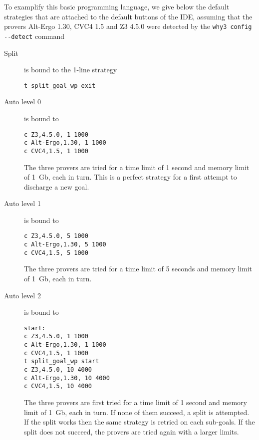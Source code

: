 To examplify this basic programming language, we give below the
default strategies that are attached to the default buttons of the
IDE, assuming that the provers Alt-Ergo 1.30, CVC4 1.5 and Z3 4.5.0
were detected by the \verb|why3 config --detect| command
\begin{description}
\item[Split] is bound to the 1-line strategy
\begin{verbatim}
t split_goal_wp exit
\end{verbatim}

\item[Auto level 0] is bound to
\begin{verbatim}
c Z3,4.5.0, 1 1000
c Alt-Ergo,1.30, 1 1000
c CVC4,1.5, 1 1000
\end{verbatim}
  The three provers are tried for a time limit of 1 second and memory
  limit of 1~Gb, each in turn. This is a perfect strategy for a first
  attempt to discharge a new goal.

\item[Auto level 1] is bound to
\begin{verbatim}
c Z3,4.5.0, 5 1000
c Alt-Ergo,1.30, 5 1000
c CVC4,1.5, 5 1000
\end{verbatim}
  The three provers are tried for a time limit of 5 seconds and memory
  limit of 1~Gb, each in turn.

\item[Auto level 2] is bound to
\begin{verbatim}
start:
c Z3,4.5.0, 1 1000
c Alt-Ergo,1.30, 1 1000
c CVC4,1.5, 1 1000
t split_goal_wp start
c Z3,4.5.0, 10 4000
c Alt-Ergo,1.30, 10 4000
c CVC4,1.5, 10 4000
\end{verbatim}
  The three provers are first tried for a time limit of 1 second and
  memory limit of 1~Gb, each in turn. If none of them succeed, a
  split is attempted. If the split works then the same strategy is
  retried on each sub-goals. If the split does not succeed, the provers
  are tried again with a larger limits.


\end{description}
